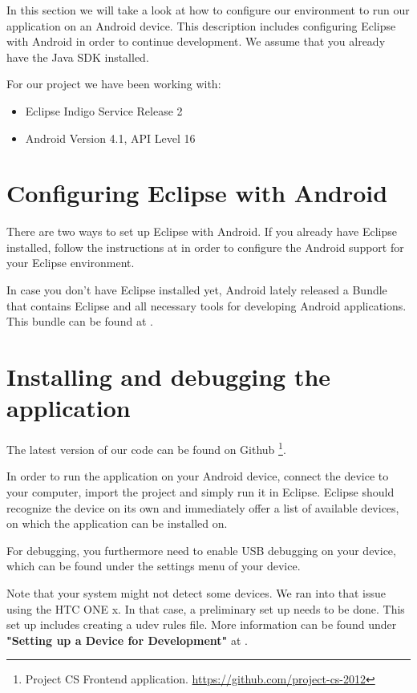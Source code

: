 In this section we will take a look at how to configure
our environment to run our application on an Android device. 
This description includes configuring Eclipse with Android in order to continue development. 
We assume that you already have the Java SDK installed.

For our project we have been working with:
\begin{itemize}
\item Eclipse Indigo Service Release 2
\item Android Version 4.1, API Level 16
\end{itemize}

\section{Configuring Eclipse with Android}
There are two ways to set up Eclipse with Android.
If you already have Eclipse installed, follow
the instructions at \cite{plugin} in order to configure the 
Android support for your Eclipse environment.

In case you don't have Eclipse installed yet, Android
lately released a Bundle that contains Eclipse and all 
necessary tools for developing Android applications.
This bundle can be found at \cite{bundle}.

\section{Installing and debugging the application}
The latest version of our code can be found on Github \footnote{Project CS Frontend application. \url{https://github.com/project-cs-2012}}.

In order to run the application on your Android device, connect the device
to your computer, import the project and simply run it in Eclipse. 
Eclipse should recognize the device on its own and immediately offer a list
of available devices, on which the application can be installed on.

For debugging, you furthermore need to enable USB debugging on your device,
which can be found under the settings menu of your device.

Note that your system might not detect some devices. We ran into that issue
using the HTC ONE x. In that case, a preliminary set up needs to be done.
This set up includes creating a udev rules file. More information
can be found under \textbf{"Setting up a Device for Development"} at
\cite{hardware}.



